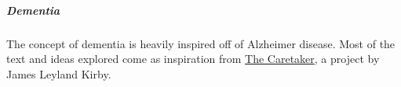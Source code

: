 \subparagraph{Dementia} The concept of dementia is heavily inspired off of Alzheimer disease.
Most of the text and ideas explored come as inspiration from \href{https://thecaretaker.bandcamp.com/}{The Caretaker}, a project by James Leyland Kirby.





